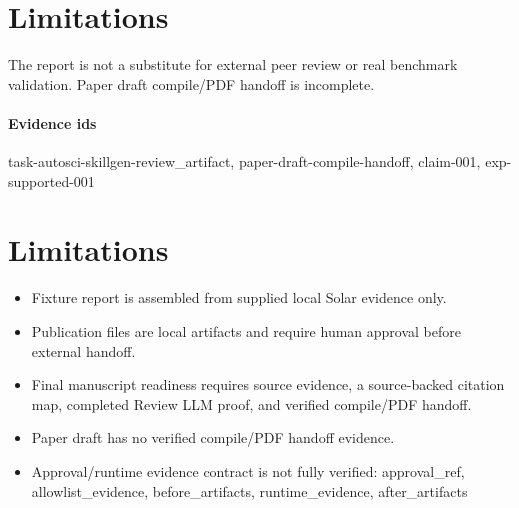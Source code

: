 \documentclass{article}
\begin{document}
\section{Limitations}
The report is not a substitute for external peer review or real benchmark validation. Paper draft compile/PDF handoff is incomplete.

\paragraph{Evidence ids} task-autosci-skillgen-review\_artifact, paper-draft-compile-handoff, claim-001, exp-supported-001

\section{Limitations}

\begin{itemize}\item Fixture report is assembled from supplied local Solar evidence only.\end{itemize}
\begin{itemize}\item Publication files are local artifacts and require human approval before external handoff.\end{itemize}
\begin{itemize}\item Final manuscript readiness requires source evidence, a source-backed citation map, completed Review LLM proof, and verified compile/PDF handoff.\end{itemize}
\begin{itemize}\item Paper draft has no verified compile/PDF handoff evidence.\end{itemize}
\begin{itemize}\item Approval/runtime evidence contract is not fully verified: approval\_ref, allowlist\_evidence, before\_artifacts, runtime\_evidence, after\_artifacts\end{itemize}
\end{document}
